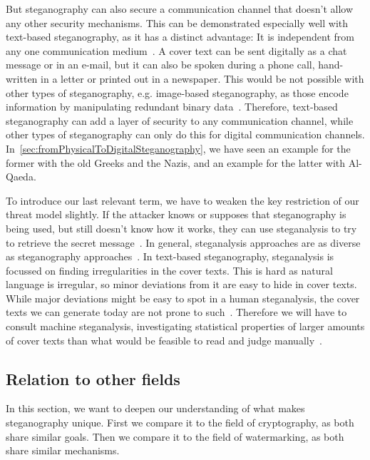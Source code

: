 But steganography can also secure a communication channel that doesn't allow any other security mechanisms. This can be demonstrated especially well with text-based steganography, as it has a distinct advantage: It is independent from any one communication medium~\cite{zieglerNeuralLinguisticSteganography2019}. A cover text can be sent digitally as a chat message or in an e-mail, but it can also be spoken during a phone call, hand-written in a letter or printed out in a newspaper. This would be not possible with other types of steganography, e.g. image-based steganography, as those encode information by manipulating redundant binary data~\cite{bennettLinguisticSteganographySurvey2004}. Therefore, text-based steganography can add a layer of security to any communication channel, while other types of steganography can only do this for digital communication channels. In~\cref{sec:fromPhysicalToDigitalSteganography}, we have seen an example for the former with the old Greeks and the Nazis, and an example for the latter with Al-Qaeda.

To introduce our last relevant term, we have to weaken the key restriction of our threat model slightly. If the attacker knows or supposes that steganography is being used, but still doesn't know how it works, they can use steganalysis to try to retrieve the secret message~\cite{bennettLinguisticSteganographySurvey2004}. In general, steganalysis approaches are as diverse as steganography approaches~\cite{bennettLinguisticSteganographySurvey2004}. In text-based steganography, steganalysis is focussed on finding irregularities in the cover texts. This is hard as natural language is irregular, so minor deviations from it are easy to hide in cover texts. While major deviations might be easy to spot in a human steganalysis, the cover texts we can generate today are not prone to such~\cite{wuGenerativeTextSteganography2024}. Therefore we will have to consult machine steganalysis, investigating statistical properties of larger amounts of cover texts than what would be feasible to read and judge manually~\cite{yangSeSyLinguisticSteganalysis2022,wuGenerativeTextSteganography2024}.

\subsection{Relation to other fields}
\label{sec:relationToOtherFields}
In this section, we want to deepen our understanding of what makes steganography unique. First we compare it to the field of cryptography, as both share similar goals. Then we compare it to the field of watermarking, as both share similar mechanisms.

